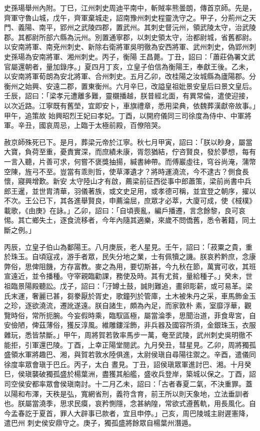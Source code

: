 \begin{pinyinscope}
 史孫瑒舉州內附。丁巳，江州刺史周迪平南中，斬賊率熊曇朗，傳首京師。先是，齊軍守魯山城，戊午，齊軍棄城走，詔南豫州刺史程靈洗守之。甲子，分荊州之天門、義陽、南平，郢州之武陵四郡，置武州。其刺史督沅州，領武陵太守，治武陵郡。其都尉所部六縣為沅州。別置通寧郡，以刺史領太守，治都尉城，省舊都尉。以安南將軍、南兗州刺史、新除右衛將軍吳明徹為安西將軍、武州刺史，偽郢州刺史孫瑒為安南將軍、湘州刺史。丙子，衡陽
 王昌薨。丁丑，詔曰：「蕭莊偽署文武官屬還朝者，量加錄序。」夏四月丁亥，立皇子伯信為衡陽王，奉獻王後。乙未，以安南將軍荀朗為安北將軍、合州刺史。五月乙卯，改桂陽之汝城縣為廬陽郡。分衡州之始興、安遠二郡，置東衡州。六月辛巳，改謚皇祖妣景安皇后曰景文皇后。壬辰，詔曰：「梁孝元遭離多難，靈櫬播越，朕昔經北面，有異常倫，遣使迎接，以次近路。江寧既有舊塋，宜即安卜，車旗禮章，悉用梁典，依魏葬漢獻帝故事。」甲午，追策故
 始興昭烈王妃曰孝妃。丁酉，以開府儀同三司徐度為侍中、中軍將軍。辛丑，國哀周忌，上臨于太極前殿，百僚陪哭。



 赦京師殊死已下。是月，葬梁元帝於江寧。秋七月甲寅，詔曰：「朕以眇身，屬當大寶，負荷至重，憂責實深，而庶績未康，胥怨猶結，佇咨賢良，發於夢想，每有一言入聽，片善可求，何嘗不褒獎抽揚，緘書紳帶。而傅巖虛往，穹谷尚淹，蒲幣空陳，旌弓不至。豈當有乖則哲，使草澤遺才？將時運澆流，今不逮古？側食長懷，寢興增歎。新安
 太守陸山才有啟，薦梁前征西從事中郎蕭策，梁前尚書中兵郎王暹，並世胄清華，羽儀著族，或文史足用，或孝德可稱，並宜登之朝序，擢以不次。王公已下，其各進舉賢良，申薦淪屈，庶眾才必萃，大廈可成，使《棫樸》載歌，《由庚》在詠。」乙卯，詔曰：「自頃喪亂，編戶播遷，言念餘黎，良可哀惕。其亡鄉失土，逐食流移者，今年內隨其適樂，來歲不問僑舊，悉令著籍，同土斷之例。」



 丙辰，立皇子伯山為鄱陽王。八月庚辰，老人星見。壬午，詔曰：「菽粟之貴，重
 於珠玉。自頃寇戎，游手者眾，民失分地之業，士有佩犢之譏。朕哀矜黔庶，念康弊俗，思俾阻饑，方存富教。麥之為用，要切斯甚，今九秋在節，萬實可收，其班宣遠近，並令播種。守宰親臨勸課，務使及時。其有尤貧，量給種子。」癸未，世祖臨景陽殿聽訟。戊子，詔曰：「汙罇土鼓，誠則難追，畫卵彫薪，或可易革。梁氏末運，奢麗已甚，芻豢厭於胥史，歌鐘列於管庫，土木被朱丹之采，車馬飾金玉之珍，逐欲澆流，遷訛遂遠。朕自諸生，頗為內足，而家敦朴
 素，室靡浮華，觀覽時俗，常所扼腕。今妄假時乘，臨馭區極，屬當淪季，思聞治道，菲食卑宮，自安儉陋，俾茲薄俗，獲反淳風。維雕鏤淫飾，非兵器及國容所須，金銀珠玉，衣服雜玩，悉皆禁斷。」甲午，周將賀若敦率馬步一萬，奄至武陵，武州刺史吳明徹不能拒，引軍還巴陵。丁酉，上幸正陽堂閱武。九月癸丑，彗星見。乙卯，周將獨孤盛領水軍將趣巴、湘，與賀若敦水陸俱進，太尉侯瑱自尋陽往禦之。辛酉，遣儀同徐度率眾會瑱于巴丘。丙子，太白
 晝見。丁丑，詔侯瑱眾軍進討巴、湘。十月癸巳，侯瑱襲破獨孤盛於楊葉洲，盡獲其船艦，盛收兵登岸，築城以保之。丁酉，詔司空侯安都率眾會侯瑱南討。十二月乙未，詔曰：「古者春夏二氣，不決重罪。蓋以陽和布澤，天秩是弘，寬網省刑，義符含育，前王所以則天象地，立法垂訓者也。朕屬當澆季，思求民瘼，哀矜惻隱，念甚納隍，常欲式遵舊軌，用長風化。自今孟春訖于夏首，罪人大辟事已款者，宜且申停。」己亥，周巴陵城主尉遲憲降，遣巴州
 刺史侯安鼎守之。庚子，獨孤盛將餘眾自楊葉州潛遁。




\end{pinyinscope}
